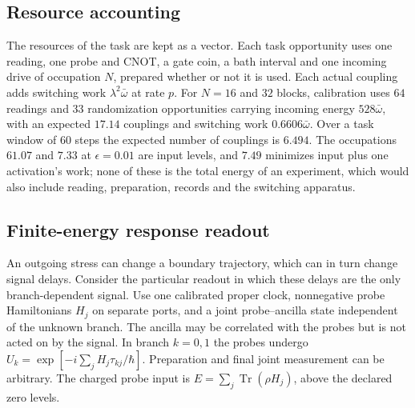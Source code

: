 \documentclass[aps,pre,onecolumn,superscriptaddress,floatfix,longbibliography]{revtex4-2}
\begin{document}
\subsection{Resource accounting}

The resources of the task are kept as a vector. Each task opportunity uses one reading, one probe and CNOT, a gate coin, a bath interval and one incoming drive of occupation $N$, prepared whether or not it is used. Each actual coupling adds switching work $\lambda^2\bar\omega$ at rate $p$. For $N=16$ and $32$ blocks, calibration uses $64$ readings and $33$ randomization opportunities carrying incoming energy $528\bar\omega$, with an expected $17.14$ couplings and switching work $0.6606\bar\omega$. Over a task window of $60$ steps the expected number of couplings is $6.494$. The occupations $61.07$ and $7.33$ at $\epsilon=0.01$ are input levels, and $7.49$ minimizes input plus one activation's work; none of these is the total energy of an experiment, which would also include reading, preparation, records and the switching apparatus.

\subsection{Finite-energy response readout}
\label{sec:readback}

An outgoing stress can change a boundary trajectory, which can in turn change
signal delays. Consider the particular readout in which these delays are the
only branch-dependent signal. Use one calibrated proper clock, nonnegative
probe Hamiltonians $H_j$ on separate ports, and a joint probe--ancilla state
independent of the unknown branch. The ancilla may be correlated with the probes
but is not acted on by the signal. In branch $k=0,1$ the probes undergo
$U_k=\exp[-i\sum_jH_j\tau_{kj}/\hbar]$. Preparation and final joint measurement
can be arbitrary. The charged probe input is
$E=\sum_j\operatorname{Tr}(\rho H_j)$, above the declared zero levels.
\end{document}
